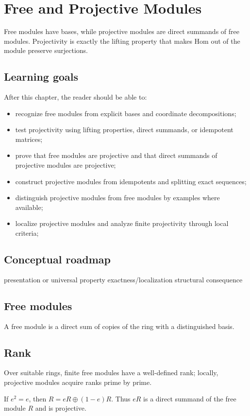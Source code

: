 \chapter{Free and Projective Modules}
\label{ch:v13}

Free modules have bases, while projective modules are direct summands of free modules. Projectivity is exactly the lifting property that makes Hom out of the module preserve surjections.

\section*{Learning goals}
After this chapter, the reader should be able to:
\begin{itemize}
\item recognize free modules from explicit bases and coordinate decompositions;
\item test projectivity using lifting properties, direct summands, or idempotent matrices;
\item prove that free modules are projective and that direct summands of projective modules are projective;
\item construct projective modules from idempotents and splitting exact sequences;
\item distinguish projective modules from free modules by examples where available;
\item localize projective modules and analyze finite projectivity through local criteria;
\end{itemize}
\section*{Conceptual roadmap}
\volroadmap
  {presentation or universal property}
  {exactness/localization}
  {structural consequence}

\section{Free modules}
A free module is a direct sum of copies of the ring with a distinguished basis.

\section{Rank}
Over suitable rings, finite free modules have a well-defined rank; locally, projective modules acquire ranks prime by prime.

\begin{example}\label{ex:v13-expand-01}
If $e^2=e$, then $R=eR\oplus(1-e)R$. Thus $eR$ is a direct summand of the free module $R$ and is projective.
\end{example}
